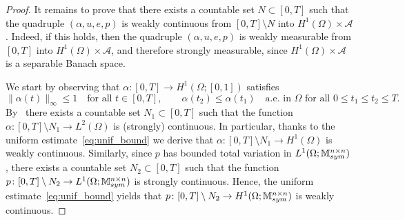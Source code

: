 \documentclass[reqno]{amsart}
\theoremstyle{definition}
\numberwithin{equation}{section}
\def\R {\mathbb R}
\def\M {\mathbb M^{n\times n}_{\rm sym}}
\begin{document}
\begin{proof}
It remains to prove that there exists a countable set $N\subset [0,T]$ such that the quadruple $(\alpha,u,e,p)$ is weakly continuous from $[0,T]\setminus N$ into $H^1(\Omega)\times \mathcal A$. Indeed, if this holds, then the quadruple $(\alpha,u,e,p)$ is weakly measurable from $[0,T]$ into $H^1(\Omega)\times \mathcal A$, and therefore strongly measurable, since $H^1(\Omega)\times \mathcal A$ is a separable Banach space.

We start by observing that $\alpha\colon [0,T]\to H^1(\Omega;[0,1])$ satisfies 
$$\|\alpha(t)\|_\infty\le 1\quad\text{for all $t\in[0,T]$},\qquad \alpha(t_2)\le \alpha(t_1)\quad\text{a.e.\ in $\Omega$ for all $0\le t_1\le t_2\le T$}.$$
By~\cite[Lemma A.2]{Cr1} there exists a countable set $N_1\subset [0,T]$ such that the function $\alpha\colon [0,T]\setminus N_1\to L^2(\Omega)$ is (strongly) continuous. In particular, thanks to the uniform estimate~\eqref{eq:unif_bound} we derive that $\alpha\colon [0,T]\setminus N_1\to H^1(\Omega)$ is weakly continuous. Similarly, since $p$ has bounded total variation in $L^1(\Omega;\M)$, there exists a countable set $N_2\subset [0,T]$ such that the function $p\colon [0,T]\setminus N_2\to L^1(\Omega;\M)$ is strongly continuous.
Hence, the uniform estimate~\eqref{eq:unif_bound} yields that $p\colon [0,T]\setminus N_2\to H^1(\Omega;\M)$ is weakly continuous. 


\end{proof}
\end{document}
